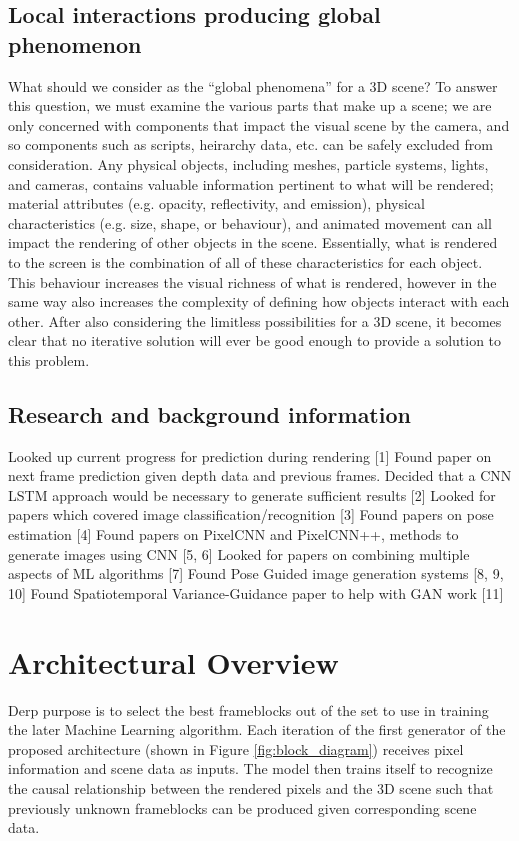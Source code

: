 \documentclass[conference]{IEEEtran}
\begin{document}
\subsection*{Local interactions producing global phenomenon}
\label{subsubsec:global_phenomenon}
What should we consider as the ``global phenomena'' for a 3D scene?
To answer this question, we must examine the various parts that make up a scene;
we are only concerned with components that impact the visual scene by the
camera, and so components such as scripts, heirarchy data, etc. can be safely
excluded from consideration. Any physical objects, including meshes, particle
systems, lights, and cameras, contains valuable information pertinent to
what will be rendered; material attributes (e.g. opacity, reflectivity, and emission),
physical characteristics (e.g. size, shape, or behaviour), and animated movement can all
impact the rendering of other objects in the scene. Essentially, what is rendered to the
screen is the combination of all of these characteristics for each object.
This behaviour increases the visual richness of what is rendered, however in the
same way also increases the complexity of defining how objects interact with
each other. After also considering the limitless possibilities for a 3D scene,
it becomes clear that no iterative solution will ever be good enough
to provide a solution to this problem.

\subsection{Research and background information}
\label{subsec:background}
Looked up current progress for prediction during rendering [1]
Found paper on next frame prediction given depth data and previous frames. Decided that a CNN LSTM approach would be necessary to generate sufficient results [2]
Looked for papers which covered image classification/recognition [3]
Found papers on pose estimation [4]
Found papers on PixelCNN and PixelCNN++, methods to generate images using CNN [5, 6]
Looked for papers on combining multiple aspects of ML algorithms [7]
Found Pose Guided image generation systems [8, 9, 10]
Found Spatiotemporal Variance-Guidance paper to help with GAN work [11]

\section{Architectural Overview}
\label{sec:important_concepts}
Derp
 purpose is to select the best frameblocks out of the set to use in training the later Machine Learning algorithm.
Each iteration of the first generator of the proposed architecture
(shown in Figure \ref{fig:block_diagram})
receives pixel information and scene data as inputs. The model then trains
itself
to recognize the causal relationship between the rendered pixels and the 3D
scene such that previously unknown frameblocks can be produced given
corresponding scene data.
\end{document}
